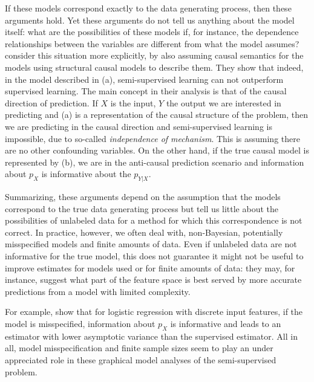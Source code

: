 \documentclass[twoside]{memoir}\usepackage[]{graphicx}\usepackage{xcolor}
\begin{document}
If these models correspond exactly to the data generating process, then these arguments hold. Yet these arguments do not tell us anything about the model itself: what are the possibilities of these models if, for instance, the dependence relationships between the variables are different from what the model assumes? \citet{Scholkopf2012} consider this situation more explicitly, by also assuming causal semantics for the models using structural causal models to describe them. They show that indeed, in the model described in (a), semi-supervised learning can not outperform supervised learning. The main concept in their analysis is that of the causal direction of prediction. If $X$ is the input, $Y$ the output we are interested in predicting and (a) is a representation of the causal structure of the problem, then we are predicting in the causal direction and semi-supervised learning is impossible, due to so-called \emph{independence of mechanism}. This is assuming there are no other confounding variables. On the other hand, if the true causal model is represented by (b), we are in the anti-causal prediction scenario and information about $p_X$ is informative about the $p_{Y|X}$.

Summarizing, these arguments depend on the assumption that the models correspond to the true data generating process but tell us little about the possibilities of unlabeled data for a method for which this correspondence is not correct. In practice, however, we often deal with, non-Bayesian, potentially misspecified models and finite amounts of data. Even if unlabeled data are not informative for the true model, this does not guarantee it might not be useful to improve estimates for models used or for finite amounts of data: they may, for instance, suggest what part of the feature space is best served by more accurate predictions from a model with limited complexity.

For example, \citet{Sokolovska2008} show that for logistic regression with discrete input features, if the model is misspecified, information about $p_X$ is informative and leads to an estimator with lower asymptotic variance than the supervised estimator. All in all, model misspecification and finite sample sizes seem to play an under appreciated role in these graphical model analyses of the semi-supervised problem.
\end{document}
